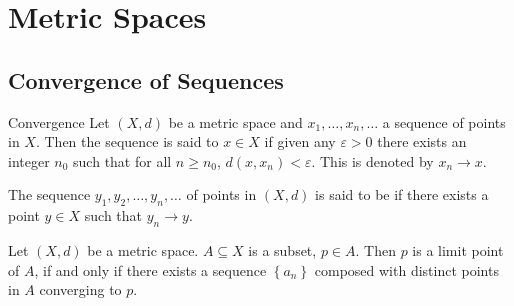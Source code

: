 \documentclass[../main.tex]{subfiles}
\begin{document}
\ifSubfilesClassLoaded{

    \tableofcontents
    
}{}

\chapter{ Metric Spaces }

\section{Convergence of Sequences}

\begin{definition}{Convergence}{}
Let $(X,d)$ be a metric space and $x_1,\dots,x_n,\dots$ a sequence of points in $X$. Then the sequence is said to  $x \in X$ if given any $\varepsilon > 0$ there exists an integer $n_0$ such that for all $n \ge n_0$, $d(x,x_n) < \varepsilon$.
This is denoted by $x_n \to x$.

The sequence $y_1,y_2,\dots,y_n,\dots$ of points in $(X,d)$ is said to be  if there exists a point $y \in X$ such that $y_n \to y$.
\end{definition}

\begin{theorem}{}{}
    Let \(  \left( X,d \right)   \) be a metric space. \(  A\subseteq X  \) is a subset, \(  p \in A  \).   Then \(  p  \) is a limit point of \(  A  \), if and only if there exists a  sequence \(    \left\{ a_{n} \right\}\) composed with distinct points in \(  A  \) converging to \(  p  \).  
\end{theorem}
\end{document}
